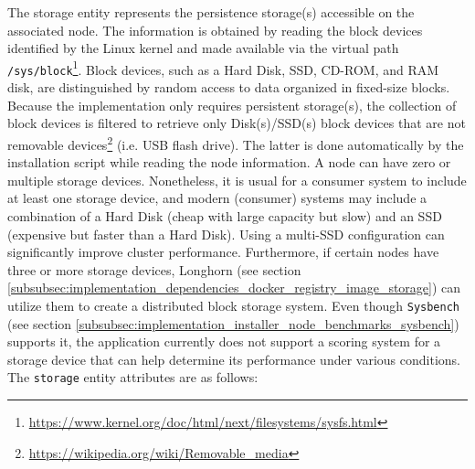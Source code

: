 The storage entity represents the persistence storage(s) accessible on the
associated node.
\newline
The information is obtained by reading the block devices identified by the Linux
kernel and made available via the virtual path \texttt{/sys/block}\footnote{\url{https://www.kernel.org/doc/html/next/filesystems/sysfs.html}}.
Block devices, such as a Hard Disk, SSD, CD-ROM, and RAM disk, are distinguished
by random access to data organized in fixed-size blocks\cite{block_device}. Because
the implementation only requires persistent storage(s), the collection of block devices
is filtered to retrieve only Disk(s)/SSD(s) block devices that are not removable
devices\footnote{\url{https://wikipedia.org/wiki/Removable_media}} (i.e. USB flash
drive). The latter is done automatically by the installation script while reading
the node information.
\newline
A node can have zero or multiple storage devices. Nonetheless, it is usual for a
consumer system to include at least one storage device, and modern (consumer) systems
may include a combination of a Hard Disk (cheap with large capacity but slow) and
an SSD (expensive but faster than a Hard Disk). Using a multi-SSD configuration
can significantly improve cluster performance. Furthermore, if certain nodes
have three or more storage devices, Longhorn (see section
\ref{subsubsec:implementation_dependencies_docker_registry_image_storage}) can utilize
them to create a distributed block storage system.
\newline
Even though \texttt{Sysbench} (see section
\ref{subsubsec:implementation_installer_node_benchmarks_sysbench}) supports it,
the application currently does not support a scoring system for a storage device
that can help determine its performance under various conditions. The \texttt{storage}
entity attributes are as follows:

